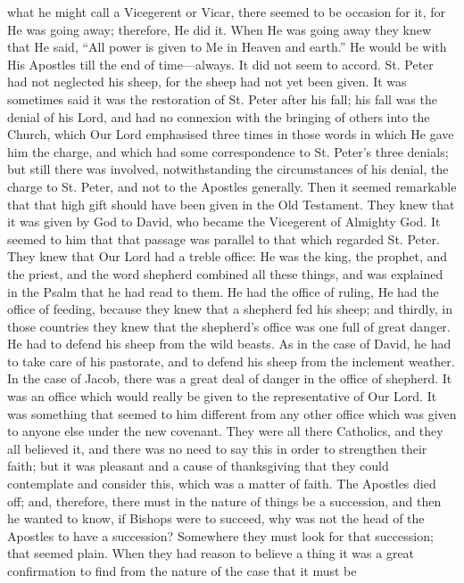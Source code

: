what he might call a Vicegerent or Vicar, there seemed to be occasion
for it, for He was going away; therefore, He did it. When He was going
away they knew that He said, ``All power is given to Me in Heaven and
earth.'' He would be with His Apostles till the end of time—always.
It did not seem to accord. St. Peter had not neglected his sheep, for
the sheep had not yet been given. It was sometimes said it was the
restoration of St. Peter after his fall; his fall was the denial of
his Lord, and had no connexion with the bringing of others into the
Church, which Our Lord emphasised three times in those words in which
He gave him the charge, and which had some correspondence to St. Peter's
three denials; but still there was involved, notwithstanding the
circumstances of his denial, the charge to St. Peter, and not to the
Apostles generally. Then it seemed remarkable that that high gift
should have been given in the Old Testament. They knew that it was
given by God to David, who became the Vicegerent of Almighty God. It
seemed to him that that passage was parallel to that which regarded
St. Peter. They knew that Our Lord had a treble office: He was the
king, the prophet, and the priest, and the word shepherd combined all
these things, and was explained in the Psalm that he had read to them.
He had the office of ruling, He had the office of feeding, because
they knew that a shepherd fed his sheep; and thirdly, in those
countries they knew that the shepherd's office was one full of great
danger. He had to defend his sheep from the wild beasts. As in the
case of David, he had to take care of his pastorate, and to defend his
sheep from the inclement weather. In the case of Jacob, there was a
great deal of danger in the office of shepherd. It was an office which
would really be given to the representative of Our Lord. It was
something that seemed to him different from any other office which was
given to anyone else under the new covenant. They were all there
Catholics, and they all believed it, and there was no need to say this
in order to strengthen their faith; but it was pleasant and a cause of
thanksgiving that they could contemplate and consider this, which was
a matter of faith. The Apostles died off; and, therefore, there must
in the nature of things be a succession, and then he wanted to know,
if Bishops were to succeed, why was not the head of the Apostles to
have a succession? Somewhere they must look for that succession; that
seemed plain. When they had reason to believe a thing it was a great
confirmation to find from the nature of the case that it must be
